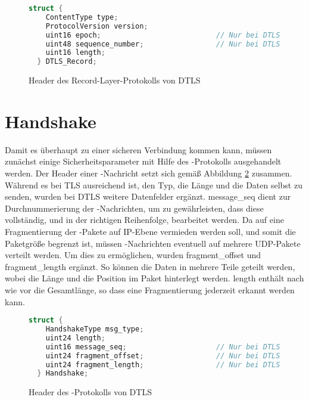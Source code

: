 \begin{figure}[ht]
  \centering
  \begin{lstlisting}[language=c]
  struct {
    ContentType type;
    ProtocolVersion version;
    uint16 epoch;                           // Nur bei DTLS
    uint48 sequence_number;                 // Nur bei DTLS
    uint16 length;
  } DTLS_Record;
  \end{lstlisting}
  \caption{Header des Record-Layer-Protokolls von DTLS}
  \label{fig:recordlayer}
\end{figure}

\section{Handshake}
\label{sec:ori-handshake}

Damit es überhaupt zu einer sicheren Verbindung kommen kann, müssen zunächst einige Sicherheitsparameter mit Hilfe des -Protokolls ausgehandelt werden.
Der Header einer -Nachricht setzt sich gemäß Abbildung \ref{fig:handshakelayer} zusammen. Während es bei TLS ausreichend ist, den Typ, die Länge und die Daten selbst
zu senden, wurden bei DTLS weitere Datenfelder ergänzt. message\_seq dient zur Durchnummerierung der -Nachrichten, um zu gewährleisten, dass diese vollständig,
und in der richtigen Reihenfolge, bearbeitet werden. Da auf eine Fragmentierung der -Pakete auf IP-Ebene vermieden werden soll, und somit die Paketgröße begrenzt ist,
müssen -Nachrichten eventuell auf mehrere UDP-Pakete verteilt werden. Um dies zu ermöglichen, wurden fragment\_offset und fragment\_length
ergänzt. So können die Daten in mehrere Teile geteilt werden, wobei die Länge und die Position im Paket hinterlegt werden. length enthält nach wie vor die
Gesamtlänge, so dass eine Fragmentierung jederzeit erkannt werden kann.

\begin{figure}[ht]
  \centering
  \begin{lstlisting}[language=c]
  struct {
    HandshakeType msg_type;
    uint24 length;
    uint16 message_seq;                     // Nur bei DTLS
    uint24 fragment_offset;                 // Nur bei DTLS
    uint24 fragment_length;                 // Nur bei DTLS
  } Handshake;
  \end{lstlisting}
  \caption{Header des -Protokolls von DTLS}
  \label{fig:handshakelayer}
\end{figure}

